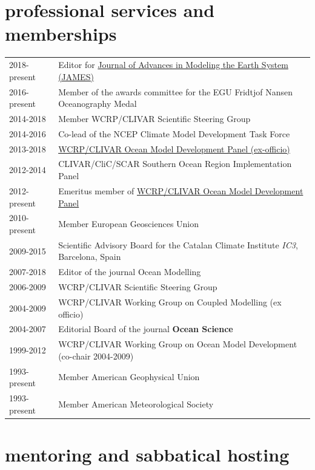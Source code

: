 \documentclass{article}
\begin{document}
\section*{\sc  \color{Maroon}  professional services and memberships}
\vspace{-.25cm}

\begin{tabular}{ll}
2018-present & Editor for  \href{http://agupubs.onlinelibrary.wiley.com/hub/journal/10.1002/(ISSN)1942-2466/editorial-board/editorial-board.html}{Journal of Advances in Modeling the Earth System (JAMES)}  
\\
  2016-present & Member of the awards committee for the EGU Fridtjof Nansen Oceanography Medal 
  \\
2014-2018 &  Member  WCRP/CLIVAR Scientific Steering Group \\
2014-2016     & Co-lead of the NCEP Climate Model Development Task Force\\
2013-2018 & \href{http://www.clivar.org/clivar-panels/omdp}{WCRP/CLIVAR Ocean Model Development Panel (ex-officio)} \\
2012-2014     & CLIVAR/CliC/SCAR Southern Ocean Region Implementation Panel \\
2012-present & Emeritus member of \href{http://www.clivar.org/clivar-panels/omdp}{WCRP/CLIVAR Ocean Model Development Panel} \\
2010-present & Member European Geosciences Union \\
2009-2015     &  Scientific Advisory Board for the Catalan  Climate Institute {\it IC3}, Barcelona, Spain \\
2007-2018 & Editor of the journal Ocean Modelling \\
2006-2009     &  WCRP/CLIVAR Scientific Steering Group \\
2004-2009     &  WCRP/CLIVAR Working Group on Coupled Modelling (ex officio) \\
2004-2007     & Editorial Board of the journal {\bf Ocean Science} \\
1999-2012     & WCRP/CLIVAR Working Group on Ocean Model Development  (co-chair 2004-2009) \\
1993-present  & Member American Geophysical Union \\
1993-present  & Member American Meteorological Society \\
\end{tabular}


\section*{\sc  \color{Maroon} mentoring and sabbatical hosting}
\vspace{-.25cm}
\end{document}
